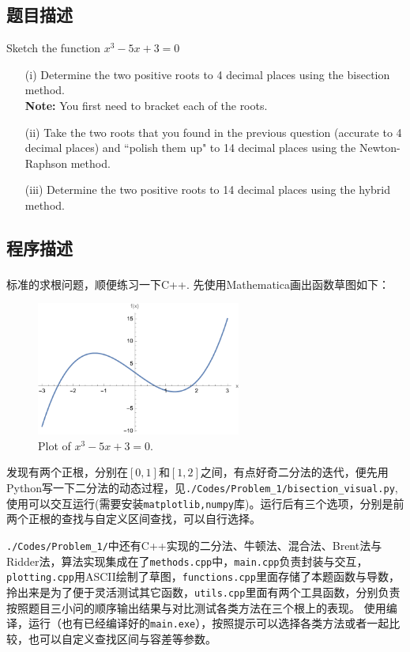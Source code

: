 \subsection{题目描述}
Sketch the function \boldmath\(x^3 - 5x + 3 = 0\)\unboldmath
\begin{enumerate}
    \item[(i)] Determine the two positive roots to 4 decimal places using the bisection method.\\
          \textbf{Note:} You first need to bracket each of the roots.

    \item[(ii)] Take the two roots that you found in the previous question (accurate to 4 decimal places) and ``polish them up" to 14 decimal places using the Newton-Raphson method.

    \item[(iii)] Determine the two positive roots to 14 decimal places using the hybrid method.
\end{enumerate}

\subsection{程序描述}
标准的求根问题，顺便练习一下C++. 先使用Mathematica\textsuperscript{\textregistered}画出函数草图如下：
\begin{figure}[H]
    \centering
    \includegraphics[width=0.6\textwidth]{Problem_1/Figs/1_plot.pdf}  %
    \caption{Plot of $x^3 - 5x + 3 = 0$.}
\end{figure}
\noindent 发现有两个正根，分别在$[0, 1]$和$[1, 2]$之间，有点好奇二分法的迭代，便先用Python写一下二分法的动态过程，见\texttt{./Codes/Problem_1/bisection\_visual.py},
使用可以交互运行(需要安装\texttt{matplotlib,numpy}库)。运行后有三个选项，分别是前两个正根的查找与自定义区间查找，可以自行选择。

\texttt{./Codes/Problem_1/}中还有C++实现的二分法、牛顿法、混合法、Brent法与Ridder法，算法实现集成在了\texttt{methods.cpp}中，\texttt{main.cpp}负责封装与交互，\texttt{plotting.cpp}用ASCII绘制了草图，\texttt{functions.cpp}里面存储了本题函数与导数，拎出来是为了便于灵活测试其它函数，\texttt{utils.cpp}里面有两个工具函数，分别负责按照题目三小问的顺序输出结果与对比测试各类方法在三个根上的表现。
使用编译，运行（也有已经编译好的\texttt{main.exe}），按照提示可以选择各类方法或者一起比较，也可以自定义查找区间与容差等参数。

